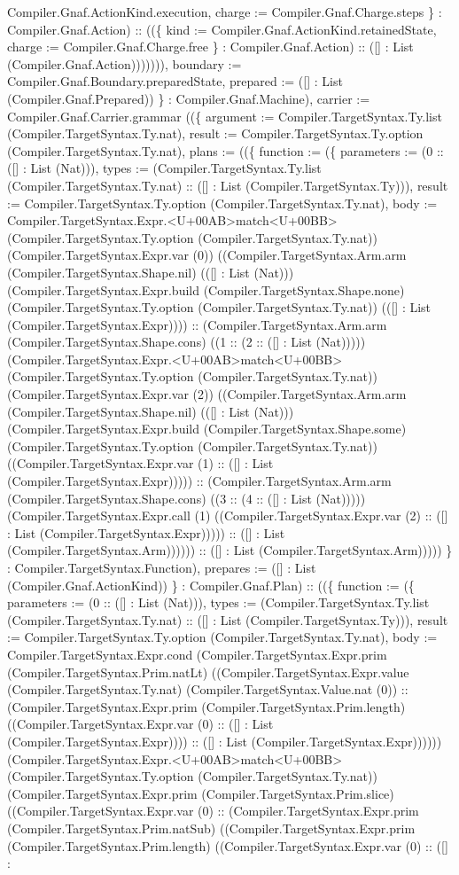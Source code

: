 \documentclass[11pt]{article}
\begin{document}
Compiler.Gnaf.ActionKind.execution, charge := Compiler.Gnaf.Charge.steps \} : Compiler.Gnaf.Action) :: ((\{ kind := Compiler.Gnaf.ActionKind.retainedState, charge := Compiler.Gnaf.Charge.free \} : Compiler.Gnaf.Action) :: ([] : List (Compiler.Gnaf.Action))))))), boundary := Compiler.Gnaf.Boundary.preparedState, prepared := ([] : List (Compiler.Gnaf.Prepared)) \} : Compiler.Gnaf.Machine), carrier := Compiler.Gnaf.Carrier.grammar ((\{ argument := Compiler.TargetSyntax.Ty.list (Compiler.TargetSyntax.Ty.nat), result := Compiler.TargetSyntax.Ty.option (Compiler.TargetSyntax.Ty.nat), plans := ((\{ function := (\{ parameters := (0 :: ([] : List (Nat))), types := (Compiler.TargetSyntax.Ty.list (Compiler.TargetSyntax.Ty.nat) :: ([] : List (Compiler.TargetSyntax.Ty))), result := Compiler.TargetSyntax.Ty.option (Compiler.TargetSyntax.Ty.nat), body := Compiler.TargetSyntax.Expr.<U+00AB>match<U+00BB> (Compiler.TargetSyntax.Ty.option (Compiler.TargetSyntax.Ty.nat)) (Compiler.TargetSyntax.Expr.var (0)) ((Compiler.TargetSyntax.Arm.arm (Compiler.TargetSyntax.Shape.nil) (([] : List (Nat))) (Compiler.TargetSyntax.Expr.build (Compiler.TargetSyntax.Shape.none) (Compiler.TargetSyntax.Ty.option (Compiler.TargetSyntax.Ty.nat)) (([] : List (Compiler.TargetSyntax.Expr)))) :: (Compiler.TargetSyntax.Arm.arm (Compiler.TargetSyntax.Shape.cons) ((1 :: (2 :: ([] : List (Nat))))) (Compiler.TargetSyntax.Expr.<U+00AB>match<U+00BB> (Compiler.TargetSyntax.Ty.option (Compiler.TargetSyntax.Ty.nat)) (Compiler.TargetSyntax.Expr.var (2)) ((Compiler.TargetSyntax.Arm.arm (Compiler.TargetSyntax.Shape.nil) (([] : List (Nat))) (Compiler.TargetSyntax.Expr.build (Compiler.TargetSyntax.Shape.some) (Compiler.TargetSyntax.Ty.option (Compiler.TargetSyntax.Ty.nat)) ((Compiler.TargetSyntax.Expr.var (1) :: ([] : List (Compiler.TargetSyntax.Expr))))) :: (Compiler.TargetSyntax.Arm.arm (Compiler.TargetSyntax.Shape.cons) ((3 :: (4 :: ([] : List (Nat))))) (Compiler.TargetSyntax.Expr.call (1) ((Compiler.TargetSyntax.Expr.var (2) :: ([] : List (Compiler.TargetSyntax.Expr))))) :: ([] : List (Compiler.TargetSyntax.Arm)))))) :: ([] : List (Compiler.TargetSyntax.Arm))))) \} : Compiler.TargetSyntax.Function), prepares := ([] : List (Compiler.Gnaf.ActionKind)) \} : Compiler.Gnaf.Plan) :: ((\{ function := (\{ parameters := (0 :: ([] : List (Nat))), types := (Compiler.TargetSyntax.Ty.list (Compiler.TargetSyntax.Ty.nat) :: ([] : List (Compiler.TargetSyntax.Ty))), result := Compiler.TargetSyntax.Ty.option (Compiler.TargetSyntax.Ty.nat), body := Compiler.TargetSyntax.Expr.cond (Compiler.TargetSyntax.Expr.prim (Compiler.TargetSyntax.Prim.natLt) ((Compiler.TargetSyntax.Expr.value (Compiler.TargetSyntax.Ty.nat) (Compiler.TargetSyntax.Value.nat (0)) :: (Compiler.TargetSyntax.Expr.prim (Compiler.TargetSyntax.Prim.length) ((Compiler.TargetSyntax.Expr.var (0) :: ([] : List (Compiler.TargetSyntax.Expr)))) :: ([] : List (Compiler.TargetSyntax.Expr)))))) (Compiler.TargetSyntax.Expr.<U+00AB>match<U+00BB> (Compiler.TargetSyntax.Ty.option (Compiler.TargetSyntax.Ty.nat)) (Compiler.TargetSyntax.Expr.prim (Compiler.TargetSyntax.Prim.slice) ((Compiler.TargetSyntax.Expr.var (0) :: (Compiler.TargetSyntax.Expr.prim (Compiler.TargetSyntax.Prim.natSub) ((Compiler.TargetSyntax.Expr.prim (Compiler.TargetSyntax.Prim.length) ((Compiler.TargetSyntax.Expr.var (0) :: ([] : 
\end{document}
